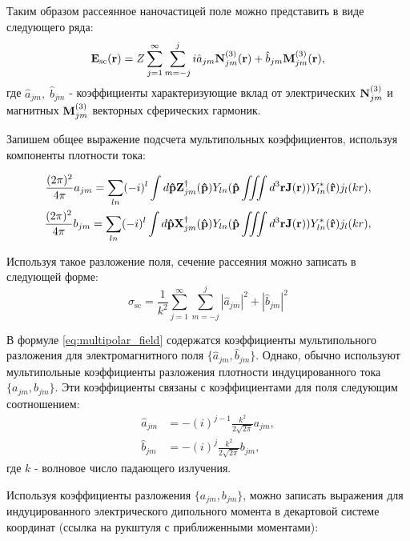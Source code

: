 Таким образом рассеянное наночастицей поле можно представить в виде следующего ряда:
\begin{equation}
    \vb{E}_{\text{sc}} (\vb{r}) = Z \sum_{j=1}^{\infty} \sum_{m=-j}^{j} i \hat{a}_{jm} \vb{N}_{jm}^{(3)}(\vb{r}) + \hat{b}_{jm} \vb{M}_{jm}^{(3)} (\vb{r}),\label{eq:multipolar_field}
\end{equation}
где $\hat{a}_{jm},\;\hat{b}_{jm}$ - коэффициенты характеризующие вклад от электрических $\vb{N}_{jm}^{(3)}$ и магнитных $\vb{M}_{jm}^{(3)}$ векторных сферических гармоник. 

Запишем общее выражение подсчета мультипольных коэффициентов, используя компоненты плотности тока:

\begin{align}
    \frac{(2\pi)^2}{4\pi} a_{jm} = \sum_{ln} (-i)^l \int d \vb{\hat{p}} \vb{Z}^{\dag}_{jm}(\vb{\hat{p}}) Y_{ln}(\vb{\hat{p}} \iiint d^3 \vb{r} \vb{J}(\vb{r})) Y_{ln}^* (\vb{\hat{r}}) j_l(kr),\\
    \frac{(2\pi)^2}{4\pi} b_{jm} = \sum_{ln} (-i)^l \int d \vb{\hat{p}} \vb{X}^{\dag}_{jm}(\vb{\hat{p}}) Y_{ln}(\vb{\hat{p}} \iiint d^3 \vb{r} \vb{J}(\vb{r})) Y_{ln}^* (\vb{\hat{r}}) j_l(kr),
\end{align}

Используя такое разложение поля, сечение рассеяния можно записать в следующей форме:
\begin{equation}
    \sigma_{\text{sc}} = \frac{1}{k^2} \sum_{j=1}^{\infty} \sum_{m=-j}^j |\hat{a}_{jm} |^2 + |\hat{b}_{jm}|^2 \label{eq:scat_sc}
\end{equation}

В формуле \eqref{eq:multipolar_field} содержатся коэффициенты мультипольного разложения для электромагнитного поля $\{\hat{a}_{jm}, \hat{b}_{jm}\}$. Однако, обычно используют мультипольные коэффициенты разложения плотности индуцированного тока $\{a_{jm}, b_{jm}\}$. Эти коэффициенты связаны с коэффициентами для поля следующим соотношением:
\begin{align}
    \hat{a}_{jm} &= -(i)^{j-1} \frac{k^2}{2 \sqrt{2 \pi}} a_{jm},\\
    \hat{b}_{jm} &= -(i)^j \frac{k^2}{2 \sqrt{2 \pi}} b_{jm},
\end{align}
где $k$ - волновое число падающего излучения. 

Используя коэффициенты разложения $\{a_{jm}, b_{jm}\}$, можно записать выражения для индуцированного электрического дипольного момента в декартовой системе координат (ссылка на рукштуля с приближенными моментами):


